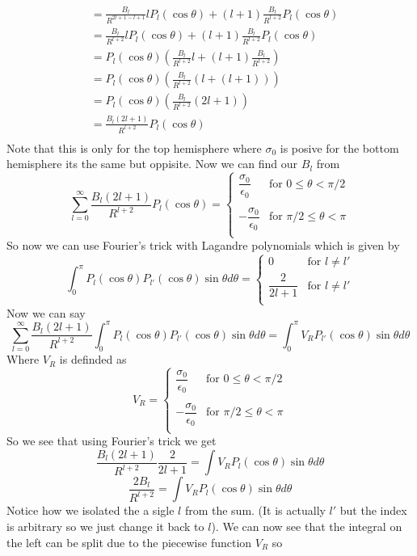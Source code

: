 \documentclass[11pt]{article}
\numberwithin{equation}{section}
\begin{document}
\begin{enumerate}[(i)]
\begin{align*}
&= \frac{B_l}{R^{2l+1-l+1}}lP_l(\cos\theta) +(l+1)\frac{B_l}{R^{l+2}}P_l(\cos\theta) \\
&= \frac{B_l}{R^{l+2}}lP_l(\cos\theta) +(l+1)\frac{B_l}{R^{l+2}}P_l(\cos\theta) \\
&= P_l(\cos\theta)\left(\frac{B_l}{R^{l+2}}l +(l+1)\frac{B_l}{R^{l+2}}\right) \\
&= P_l(\cos\theta)\left(\frac{B_l}{R^{l+2}}(l +(l+1))\right) \\
&= P_l(\cos\theta)\left(\frac{B_l}{R^{l+2}}(2l+1)\right) \\
&= \frac{B_l(2l+1)}{R^{l+2}}P_l(\cos\theta)\\
\end{align*}
Note that this is only for the top hemisphere where $\sigma_0$ is posive for the bottom hemisphere its the same but oppisite. Now we can find our $B_l$ from 
$$\sum_{l=0}^{\infty}\frac{B_l(2l+1)}{R^{l+2}}P_l(\cos\theta) = \left\{\begin{array}{cc}
	\dfrac{\sigma_0}{\epsilon_0} &\mbox{for } 0\le\theta<\pi/2\\
\\
	-\dfrac{\sigma_0}{\epsilon_0} &\mbox{for } \pi/2\le\theta<\pi\\
	\end{array}\right.$$
So now we can use Fourier's trick with Lagandre polynomials which is given by
$$\int_0^{\pi} P_l(\cos\theta)P_{l'}(\cos\theta)\sin\theta d\theta = \left\{\begin{array}{cc}
		0 &\mbox{for } l\ne l'\\
		\dfrac{2}{2l+1} &\mbox{for } l\ne l'\\
		\end{array}\right.$$
Now we can say
$$\sum_{l=0}^{\infty}\frac{B_l(2l+1)}{R^{l+2}}\int_0^{\pi} P_l(\cos\theta)P_{l'}(\cos\theta)\sin\theta d\theta = \int_0^{\pi} V_R P_{l'}(\cos\theta)\sin\theta d\theta$$
Where $V_R$ is definded as
$$V_R = \left\{\begin{array}{cc}
	\dfrac{\sigma_0}{\epsilon_0} &\mbox{for } 0\le\theta<\pi/2\\
\\
	-\dfrac{\sigma_0}{\epsilon_0} &\mbox{for } \pi/2\le\theta<\pi\\
	\end{array}\right.$$
So we see that using Fourier's trick we get
$$\frac{B_l(2l+1)}{R^{l+2}}\frac{2}{2l+1} = \int V_R P_{l}(\cos\theta)\sin\theta d\theta$$
$$\frac{2B_l}{R^{l+2}}= \int V_R P_{l}(\cos\theta)\sin\theta d\theta$$
Notice how we isolated the a sigle $l$ from the sum. (It is actually $l'$ but the index is arbitrary so we just change it back to $l$). We can now see that the integral on the left can be split due to the piecewise function $V_R$ so 

\end{enumerate}
\end{document}

